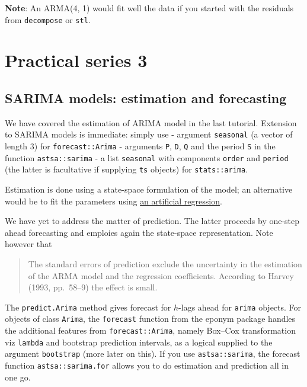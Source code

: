 \documentclass[]{book}
\begin{document}
\textbf{Note}: An ARMA(4, 1) would fit well the data if you started with
the residuals from \texttt{decompose} or \texttt{stl}.

\chapter{Practical series 3}\label{practical-series-3}

\section{SARIMA models: estimation and
forecasting}\label{sarima-models-estimation-and-forecasting}

We have covered the estimation of ARIMA model in the last tutorial.
Extension to SARIMA models is immediate: simply use - argument
\texttt{seasonal} (a vector of length 3) for \texttt{forecast::Arima} -
arguments \texttt{P}, \texttt{D}, \texttt{Q} and the period \texttt{S}
in the function \texttt{astsa::sarima} - a list \texttt{seasonal} with
components \texttt{order} and \texttt{period} (the latter is facultative
if supplying \texttt{ts} objects) for \texttt{stats::arima}.

Estimation is done using a state-space formulation of the model; an
alternative would be to fit the parameters using
\href{http://russell-davidson.arts.mcgill.ca/e761/mlzero3.pdf}{an
artificial regression}.

We have yet to address the matter of prediction. The latter proceeds by
one-step ahead forecasting and emploies again the state-space
representation. Note however that

\begin{quote}
The standard errors of prediction exclude the uncertainty in the
estimation of the ARMA model and the regression coefficients. According
to Harvey (1993, pp.~58--9) the effect is small.
\end{quote}

The \texttt{predict.Arima} method gives forecast for \(h\)-lags ahead
for \texttt{arima} objects. For objects of class \texttt{Arima}, the
\texttt{forecast} function from the eponym package handles the
additional features from \texttt{forecast::Arima}, namely Box--Cox
transformation viz \texttt{lambda} and bootstrap prediction intervals,
as a logical supplied to the argument \texttt{bootstrap} (more later on
this). If you use \texttt{astsa::sarima}, the forecast function
\texttt{astsa::sarima.for} allows you to do estimation and prediction
all in one go.
\end{document}
